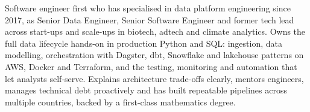 
\begin{cvparagraph}

Software engineer first who has specialised in data platform engineering since 2017, as Senior Data Engineer, Senior Software Engineer and former tech lead across start-ups and scale-ups in biotech, adtech and climate analytics. Owns the full data lifecycle hands-on in production Python and SQL: ingestion, data modelling, orchestration with Dagster, dbt, Snowflake and lakehouse patterns on AWS, Docker and Terraform, and the testing, monitoring and automation that let analysts self-serve. Explains architecture trade-offs clearly, mentors engineers, manages technical debt proactively and has built repeatable pipelines across multiple countries, backed by a first-class mathematics degree.

\end{cvparagraph}

